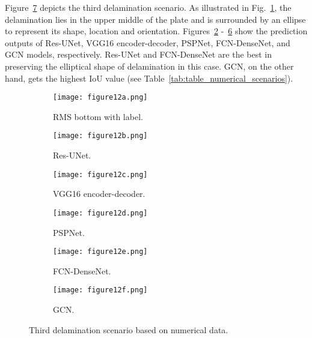 Figure~\ref{fig:475_softmax} depicts the third delamination scenario.
As illustrated in Fig.~\ref{fig:RMS_flat_shell_Vz_475}, the delamination lies in the upper middle of the plate and is surrounded by an ellipse to represent its shape, location and orientation.
Figures~\ref{fig:Unet_Pred__softmax_475} -~\ref{fig:gcn_pred_475} show the prediction outputs of Res-UNet, VGG16 encoder-decoder, PSPNet, FCN-DenseNet, and GCN models, respectively.
Res-UNet and FCN-DenseNet are the best in preserving the elliptical shape of delamination in this case.
GCN, on the other hand, gets the highest IoU value (see Table~\ref{tab:table_numerical_scenarios}).
\begin{figure}[!h]
	\centering
	\begin{subfigure}[b]{0.47\textwidth}
		\centering
		\texttt{[image: figure12a.png]}
		\caption{RMS bottom with label.}
		\label{fig:RMS_flat_shell_Vz_475}
	\end{subfigure}
	\hfill
	\begin{subfigure}[b]{0.47\textwidth}
		\centering
		\texttt{[image: figure12b.png]}
		\caption{Res-UNet.}
		\label{fig:Unet_Pred__softmax_475}
	\end{subfigure}
	\hfill
	\begin{subfigure}[b]{0.47\textwidth}
		\centering
		\texttt{[image: figure12c.png]}
		\caption{VGG16 encoder-decoder.}			\label{fig:vgg16_pred__softmax_475}			
	\end{subfigure}
	\hfill
	\begin{subfigure}[b]{0.47\textwidth}
		\centering
		\texttt{[image: figure12d.png]}
		\caption{PSPNet.}
		\label{fig:pspnet_pred__softmax_475}
	\end{subfigure}	
	\hfill
	\begin{subfigure}[b]{0.47\textwidth}
		\centering
		\texttt{[image: figure12e.png]}
		\caption{FCN-DenseNet.}
		\label{fig:fcn_densenet_pred__softmax_475}
	\end{subfigure}
	\hfill
	\begin{subfigure}[b]{0.47\textwidth}
		\centering
		\texttt{[image: figure12f.png]}
		\caption{GCN.}
		\label{fig:gcn_pred_475}
	\end{subfigure}	
	\caption{Third delamination scenario based on numerical data.}
	\label{fig:475_softmax}
\end{figure}
\clearpage

